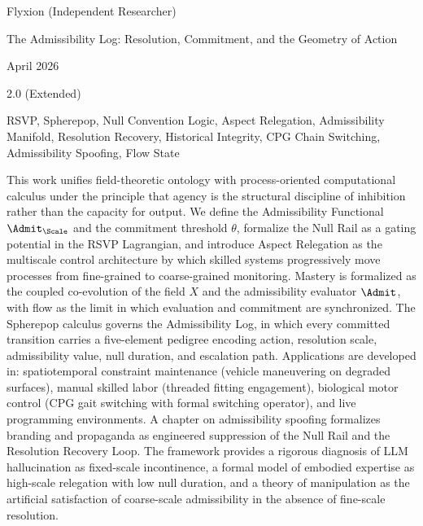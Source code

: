 \documentclass[11pt,oneside]{book}
\begin{document}
\begin{description}[style=multiline, leftmargin=4cm, font=\normalfont\itshape]
    \item[Author] Flyxion (Independent Researcher)
    \item[Title] The Admissibility Log: Resolution, Commitment, and the Geometry of Action
    \item[Date] April 2026
    \item[Version] 2.0 (Extended)
    \item[Keywords] RSVP, Spherepop, Null Convention Logic, Aspect Relegation, Admissibility Manifold, Resolution Recovery, Historical Integrity, CPG Chain Switching, Admissibility Spoofing, Flow State
    \item[Abstract] This work unifies field-theoretic ontology with process-oriented computational calculus under the principle that agency is the structural discipline of inhibition rather than the capacity for output. We define the Admissibility Functional $\Admit_\Scale$ and the commitment threshold $\theta$, formalize the Null Rail as a gating potential in the RSVP Lagrangian, and introduce Aspect Relegation as the multiscale control architecture by which skilled systems progressively move processes from fine-grained to coarse-grained monitoring. Mastery is formalized as the coupled co-evolution of the field $X$ and the admissibility evaluator $\Admit$, with flow as the limit in which evaluation and commitment are synchronized. The Spherepop calculus governs the Admissibility Log, in which every committed transition carries a five-element pedigree encoding action, resolution scale, admissibility value, null duration, and escalation path. Applications are developed in: spatiotemporal constraint maintenance (vehicle maneuvering on degraded surfaces), manual skilled labor (threaded fitting engagement), biological motor control (CPG gait switching with formal switching operator), and live programming environments. A chapter on admissibility spoofing formalizes branding and propaganda as engineered suppression of the Null Rail and the Resolution Recovery Loop. The framework provides a rigorous diagnosis of LLM hallucination as fixed-scale incontinence, a formal model of embodied expertise as high-scale relegation with low null duration, and a theory of manipulation as the artificial satisfaction of coarse-scale admissibility in the absence of fine-scale resolution.
\end{description}
\end{document}
